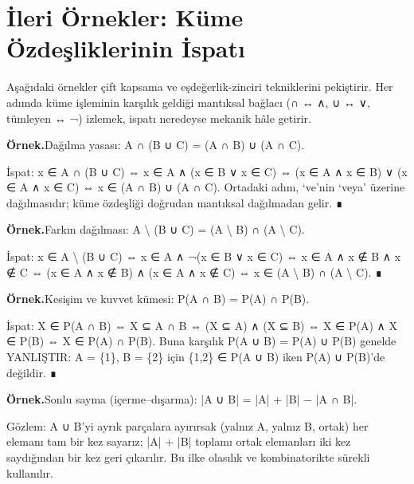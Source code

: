 \section{İleri Örnekler: Küme Özdeşliklerinin İspatı}

Aşağıdaki örnekler çift kapsama ve eşdeğerlik-zinciri tekniklerini pekiştirir. Her adımda küme işleminin karşılık geldiği mantıksal bağlacı (∩ ↔ ∧, ∪ ↔ ∨, tümleyen ↔ ¬) izlemek, ispatı neredeyse mekanik hâle getirir.

\begin{tcolorbox}[bookbox,colback=cEx]\textbf{\textsf{\textcolor{cAcc}{Örnek.}}}\quad Dağılma yasası: A ∩ (B ∪ C) = (A ∩ B) ∪ (A ∩ C).\par\medskip{}İspat: x ∈ A ∩ (B ∪ C) ⇔ x ∈ A ∧ (x ∈ B ∨ x ∈ C) ⇔ (x ∈ A ∧ x ∈ B) ∨ (x ∈ A ∧ x ∈ C) ⇔ x ∈ (A ∩ B) ∪ (A ∩ C). Ortadaki adım, ‘ve’nin ‘veya’ üzerine dağılmasıdır; küme özdeşliği doğrudan mantıksal dağılmadan gelir. ∎\end{tcolorbox}

\begin{tcolorbox}[bookbox,colback=cEx]\textbf{\textsf{\textcolor{cAcc}{Örnek.}}}\quad Farkın dağılması: A \textbackslash{} (B ∪ C) = (A \textbackslash{} B) ∩ (A \textbackslash{} C).\par\medskip{}İspat: x ∈ A \textbackslash{} (B ∪ C) ⇔ x ∈ A ∧ ¬(x ∈ B ∨ x ∈ C) ⇔ x ∈ A ∧ x ∉ B ∧ x ∉ C ⇔ (x ∈ A ∧ x ∉ B) ∧ (x ∈ A ∧ x ∉ C) ⇔ x ∈ (A \textbackslash{} B) ∩ (A \textbackslash{} C). ∎\end{tcolorbox}

\begin{tcolorbox}[bookbox,colback=cEx]\textbf{\textsf{\textcolor{cAcc}{Örnek.}}}\quad Kesişim ve kuvvet kümesi: P(A ∩ B) = P(A) ∩ P(B).\par\medskip{}İspat: X ∈ P(A ∩ B) ⇔ X ⊆ A ∩ B ⇔ (X ⊆ A) ∧ (X ⊆ B) ⇔ X ∈ P(A) ∧ X ∈ P(B) ⇔ X ∈ P(A) ∩ P(B). Buna karşılık P(A ∪ B) = P(A) ∪ P(B) genelde YANLIŞTIR: A = \{1\}, B = \{2\} için \{1,2\} ∈ P(A ∪ B) iken P(A) ∪ P(B)’de değildir. ∎\end{tcolorbox}

\begin{tcolorbox}[bookbox,colback=cEx]\textbf{\textsf{\textcolor{cAcc}{Örnek.}}}\quad Sonlu sayma (içerme–dışarma): |A ∪ B| = |A| + |B| − |A ∩ B|.\par\medskip{}Gözlem: A ∪ B’yi ayrık parçalara ayırırsak (yalnız A, yalnız B, ortak) her elemanı tam bir kez sayarız; |A| + |B| toplamı ortak elemanları iki kez saydığından bir kez geri çıkarılır. Bu ilke olasılık ve kombinatorikte sürekli kullanılır.\end{tcolorbox}

